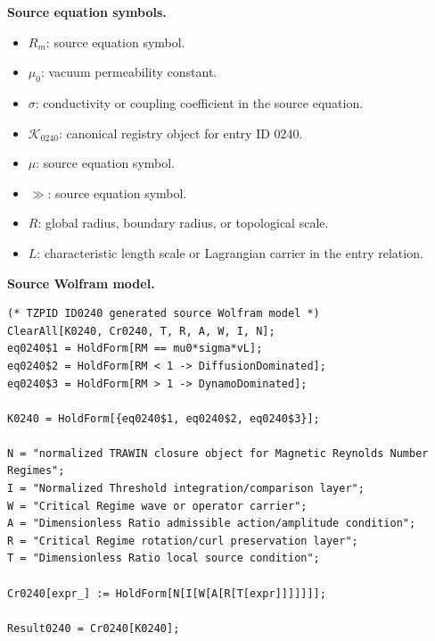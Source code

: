 \begin{minipage}[t]{0.49\linewidth}
\begingroup
\small
\raggedright
\textbf{Source equation symbols.}\par
\begin{itemize}[leftmargin=1.35em,itemsep=1pt,topsep=1pt,parsep=0pt]
    \item $R_m$: source equation symbol.
    \item $\mu_0$: vacuum permeability constant.
    \item $\sigma$: conductivity or coupling coefficient in the source equation.
    \item $\mathcal{K}_{0240}$: canonical registry object for entry ID 0240.
    \item $\mu$: source equation symbol.
    \item $\gg$: source equation symbol.
    \item $R$: global radius, boundary radius, or topological scale.
    \item $L$: characteristic length scale or Lagrangian carrier in the entry relation.
\end{itemize}
\endgroup
\end{minipage}\hfill
\begin{minipage}[t]{0.47\linewidth}
\begingroup
\scriptsize
\raggedright
\textbf{Source Wolfram model.}\par
\begin{Verbatim}[fontsize=\tiny,breaklines=true,breakanywhere=true]
(* TZPID ID0240 generated source Wolfram model *)
ClearAll[K0240, Cr0240, T, R, A, W, I, N];
eq0240$1 = HoldForm[RM == mu0*sigma*vL];
eq0240$2 = HoldForm[RM < 1 -> DiffusionDominated];
eq0240$3 = HoldForm[RM > 1 -> DynamoDominated];

K0240 = HoldForm[{eq0240$1, eq0240$2, eq0240$3}];

N = "normalized TRAWIN closure object for Magnetic Reynolds Number Regimes";
I = "Normalized Threshold integration/comparison layer";
W = "Critical Regime wave or operator carrier";
A = "Dimensionless Ratio admissible action/amplitude condition";
R = "Critical Regime rotation/curl preservation layer";
T = "Dimensionless Ratio local source condition";

Cr0240[expr_] := HoldForm[N[I[W[A[R[T[expr]]]]]]];

Result0240 = Cr0240[K0240];
\end{Verbatim}
\endgroup
\end{minipage}

